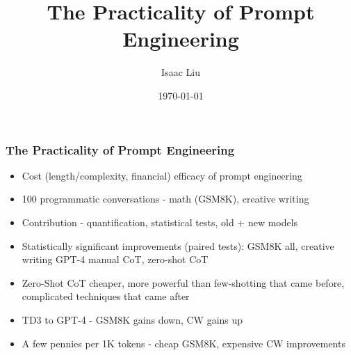 \documentclass{beamer}
\title[The Practicality of Prompt Engineering]{The Practicality of Prompt Engineering}
\author{Isaac Liu}
\date{\today}
\begin{document}
    \begin{frame}
        \frametitle{The Practicality of Prompt Engineering}
        \begin{itemize}
            \scriptsize
            \item Cost (length/complexity, financial) efficacy of prompt engineering
            \item 100 programmatic conversations - math (GSM8K), creative writing
            \item Contribution - quantification, statistical tests, old + new models
            \item Statistically significant improvements (paired tests): GSM8K all, creative writing GPT-4 manual CoT, zero-shot CoT
            \item Zero-Shot CoT cheaper, more powerful than few-shotting that came before, complicated techniques that came after
            \item TD3 to GPT-4 - GSM8K gains down, CW gains up
            \item A few pennies per 1K tokens - cheap GSM8K, expensive CW improvements
        \end{itemize}
        \begin{minipage}{1.1\textwidth}
            \begin{figure}[h]
                \begin{subfigure}[h]{0.4925\textwidth}
                    \centering

\end{subfigure}
\end{figure}
\end{minipage}
\end{frame}
\end{document}
